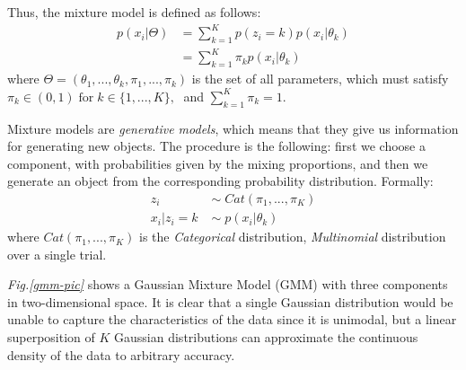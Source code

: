 Thus, the mixture model is defined as follows:
\begin{equation} \label{mix-model-f-mm}
	\begin{aligned}
		p(x_{i}|\Theta) & = \sum_{k=1}^{K} p(z_{i} = k) p(x_{i}|\theta_{k}) \\
			& = \sum_{k=1}^{K}\pi_{k} p(x_{i}|\theta_{k})
	\end{aligned}
\end{equation}
where $\Theta = (\theta_{1},..., \theta_{k}, \pi_{1},..., \pi_{k})$ is the set of all parameters, which must satisfy $\pi_{k} \in (0, 1) \; \text{for} \; k \in \lbrace 1,...,K \rbrace, \;$ and $\sum_{k=1}^{K}\pi_{k} = 1$.

Mixture models are \emph{generative models}, which means that they give us information for generating new objects. The procedure is the following: first we choose a component, with probabilities given by the mixing proportions, and then we generate an object from the corresponding probability distribution. Formally:
\begin{equation}
	\begin{aligned}
		z_{i} \; & \sim \; Cat(\pi_{1},...,\pi_{K}) \\
		x_{i} | z_{i}=k \; & \sim \; p(x_{i}|\theta_{k})
	\end{aligned}
\end{equation}
where $Cat(\pi_{1},...,\pi_{K})$ is the \emph{Categorical} distribution, \ie \emph{Multinomial} distribution over a single trial.

\emph{Fig.\ref{gmm-pic}} shows a Gaussian Mixture Model (GMM) with three components in two-dimensional space. It is clear that a single Gaussian distribution would be unable to capture the characteristics of the data since it is unimodal, but a linear superposition of $K$ Gaussian distributions can approximate the continuous density of the data to arbitrary accuracy. 

